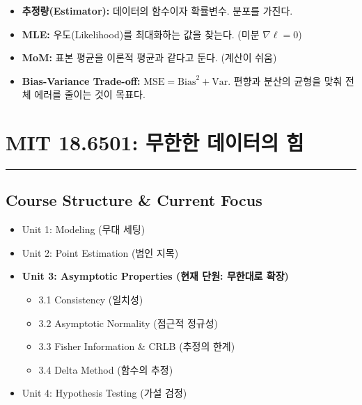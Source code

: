 \documentclass[11pt,a4paper]{book}
\theoremstyle{definition}
\begin{document}
\begin{summarybox}[title={Unit 2 핵심 요약}]
\begin{itemize}
    \item \textbf{추정량(Estimator):} 데이터의 함수이자 확률변수. 분포를 가진다.
    \item \textbf{MLE:} 우도(Likelihood)를 최대화하는 값을 찾는다. (미분 $\nabla \ell = 0$)
    \item \textbf{MoM:} 표본 평균을 이론적 평균과 같다고 둔다. (계산이 쉬움)
    \item \textbf{Bias-Variance Trade-off:} $\text{MSE} = \text{Bias}^2 + \text{Var}$. 편향과 분산의 균형을 맞춰 전체 에러를 줄이는 것이 목표다.
\end{itemize}
\end{summarybox}


\chapter{MIT 18.6501: 무한한 데이터의 힘}
\label{ch:lecture3}


\vspace{1cm}
\hrule
\vspace{1cm}

\section*{Course Structure \& Current Focus}
\begin{itemize}
    \item Unit 1: Modeling (무대 세팅)
    \item Unit 2: Point Estimation (범인 지목)
    \item \textbf{\textcolor{mainblue}{Unit 3: Asymptotic Properties (현재 단원: 무한대로 확장)}}
    \begin{itemize}
        \item 3.1 Consistency (일치성)
        \item 3.2 Asymptotic Normality (점근적 정규성)
        \item 3.3 Fisher Information \& CRLB (추정의 한계)
        \item 3.4 Delta Method (함수의 추정)
    \end{itemize}
    \item Unit 4: Hypothesis Testing (가설 검정)
\end{itemize}
\end{document}
